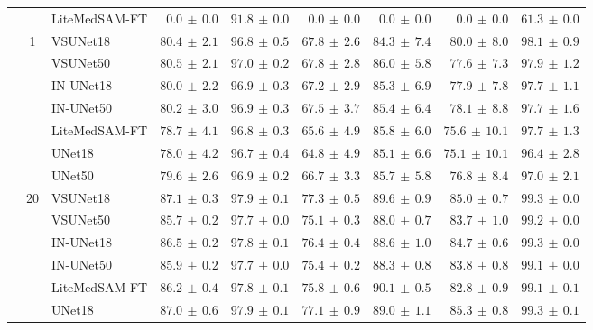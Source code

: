 \documentclass[%
reprint,
nofootinbib,
 amsmath,amssymb,
aps,
superscriptaddress,
showkeys,
longbibliography
]{revtex4-1}
\begin{document}
\begin{table}[t]
\begin{tabular}{l c l r r r r r r}
 &  & LiteMedSAM-FT & $0.0 \,\pm\, 0.0$ & $91.8 \,\pm\, 0.0$ & $0.0 \,\pm\, 0.0$ & $0.0 \,\pm\, 0.0$ & $0.0 \,\pm\, 0.0$ & $61.3 \,\pm\, 0.0$ \\
\cline{2-9}
 & \multirow{7}{*}{1} & VSUNet18 & $80.4 \,\pm\, 2.1$ & $96.8 \,\pm\, 0.5$ & $67.8 \,\pm\, 2.6$ & $84.3 \,\pm\, 7.4$ & $80.0 \,\pm\, 8.0$ & $98.1 \,\pm\, 0.9$ \\
 &  & VSUNet50 & $\mathbf{80.5} \,\pm\, 2.1$ & $97.0 \,\pm\, 0.2$ & $67.8 \,\pm\, 2.8$ & $86.0 \,\pm\, 5.8$ & $77.6 \,\pm\, 7.3$ & $97.9 \,\pm\, 1.2$ \\
 &  & IN-UNet18 & $80.0 \,\pm\, 2.2$ & $96.9 \,\pm\, 0.3$ & $67.2 \,\pm\, 2.9$ & $85.3 \,\pm\, 6.9$ & $77.9 \,\pm\, 7.8$ & $97.7 \,\pm\, 1.1$ \\
 &  & IN-UNet50 & $80.2 \,\pm\, 3.0$ & $96.9 \,\pm\, 0.3$ & $67.5 \,\pm\, 3.7$ & $85.4 \,\pm\, 6.4$ & $78.1 \,\pm\, 8.8$ & $97.7 \,\pm\, 1.6$ \\
 &  & LiteMedSAM-FT & $78.7 \,\pm\, 4.1$ & $96.8 \,\pm\, 0.3$ & $65.6 \,\pm\, 4.9$ & $85.8 \,\pm\, 6.0$ & $75.6 \,\pm\, 10.1$ & $97.7 \,\pm\, 1.3$ \\
 &  & UNet18 & $78.0 \,\pm\, 4.2$ & $96.7 \,\pm\, 0.4$ & $64.8 \,\pm\, 4.9$ & $85.1 \,\pm\, 6.6$ & $75.1 \,\pm\, 10.1$ & $96.4 \,\pm\, 2.8$ \\
 &  & UNet50 & $79.6 \,\pm\, 2.6$ & $96.9 \,\pm\, 0.2$ & $66.7 \,\pm\, 3.3$ & $85.7 \,\pm\, 5.8$ & $76.8 \,\pm\, 8.4$ & $97.0 \,\pm\, 2.1$ \\
\cline{2-9}
 & \multirow{7}{*}{20} & VSUNet18 & $\mathbf{87.1} \,\pm\, 0.3$ & $97.9 \,\pm\, 0.1$ & $77.3 \,\pm\, 0.5$ & $89.6 \,\pm\, 0.9$ & $85.0 \,\pm\, 0.7$ & $99.3 \,\pm\, 0.0$ \\
 &  & VSUNet50 & $85.7 \,\pm\, 0.2$ & $97.7 \,\pm\, 0.0$ & $75.1 \,\pm\, 0.3$ & $88.0 \,\pm\, 0.7$ & $83.7 \,\pm\, 1.0$ & $99.2 \,\pm\, 0.0$ \\
 &  & IN-UNet18 & $86.5 \,\pm\, 0.2$ & $97.8 \,\pm\, 0.1$ & $76.4 \,\pm\, 0.4$ & $88.6 \,\pm\, 1.0$ & $84.7 \,\pm\, 0.6$ & $99.3 \,\pm\, 0.0$ \\
 &  & IN-UNet50 & $85.9 \,\pm\, 0.2$ & $97.7 \,\pm\, 0.0$ & $75.4 \,\pm\, 0.2$ & $88.3 \,\pm\, 0.8$ & $83.8 \,\pm\, 0.8$ & $99.1 \,\pm\, 0.0$ \\
 &  & LiteMedSAM-FT & $86.2 \,\pm\, 0.4$ & $97.8 \,\pm\, 0.1$ & $75.8 \,\pm\, 0.6$ & $90.1 \,\pm\, 0.5$ & $82.8 \,\pm\, 0.9$ & $99.1 \,\pm\, 0.1$ \\
 &  & UNet18 & $87.0 \,\pm\, 0.6$ & $97.9 \,\pm\, 0.1$ & $77.1 \,\pm\, 0.9$ & $89.0 \,\pm\, 1.1$ & $85.3 \,\pm\, 0.8$ & $99.3 \,\pm\, 0.1$ \\

\end{tabular}
\end{table}
\end{document}
